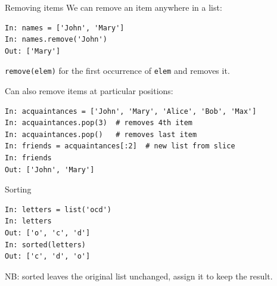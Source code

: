 \documentclass[aspectratio=169,usenames,dvipsnames]{beamer}
\begin{document}
\begin{frame}[fragile]{Removing items}
We can remove an item anywhere in a list:
\begin{lstlisting} 
In: names = ['John', 'Mary']
In: names.remove('John')
Out: ['Mary']
\end{lstlisting}

\texttt{remove(elem)}  for the first occurrence of
\texttt{elem} and removes it.

\pause
\vspace{1em}
Can also remove items at particular positions:
\begin{lstlisting} 
In: acquaintances = ['John', 'Mary', 'Alice', 'Bob', 'Max']
In: acquaintances.pop(3)  # removes 4th item
In: acquaintances.pop()   # removes last item
In: friends = acquaintances[:2]  # new list from slice
In: friends
Out: ['John', 'Mary']
\end{lstlisting}

\end{frame}

\begin{frame}[fragile]{Sorting}
\begin{lstlisting} 
In: letters = list('ocd')
In: letters
Out: ['o', 'c', 'd']
In: sorted(letters)
Out: ['c', 'd', 'o']
\end{lstlisting}

NB: sorted leaves the original list unchanged,
assign it to keep the result.
\end{frame}
\end{document}
